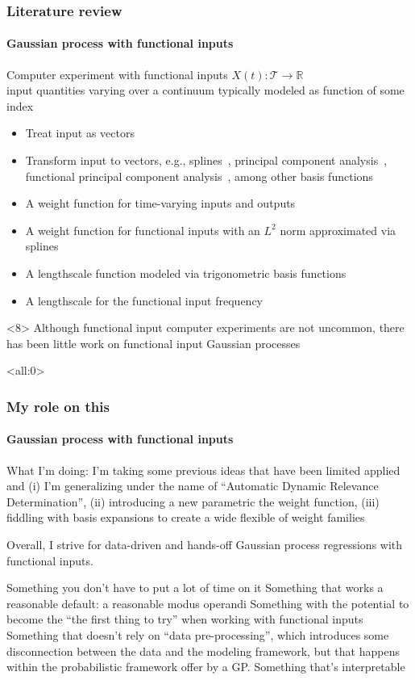 \documentclass[handout]{snedecorbeamer}
\begin{document}
\begin{frame}
  \frametitle{Literature review}
  \framesubtitle{Gaussian process with functional inputs}

  Computer experiment with functional inputs $X(t):
  \mathcal{T}\to\mathbb{R}$ \\
  input quantities varying over a continuum typically modeled as function of
  some index

  \begin{itemize}[<+(1)->]
  \item Treat input as vectors~\citep{iooss2009}
  \item Transform input to vectors, e.g.,
    splines~\citep{betancourt2020,betancourt2020a}, principal component
    analysis~\citep{nanty2016}, functional principal component
    analysis~\citep{wang2017,wang2019}, among other basis
    functions~\citep{tan2019,li2021,striegel2022}
  \item A weight function for time-varying inputs and outputs~\citep{morris2012}
  \item A weight function for functional inputs with an $L^2$ norm approximated
    via splines \citep{muehlenstaedt2017}
  \item A lengthscale function modeled via trigonometric basis functions
    \citep{kuttubekova2019}
  \item A lengthscale for the functional input frequency \citep{chen2021}
  \end{itemize}

  \vfill{}
  \begin{exampleblock}{}<8>
    Although functional input computer experiments are not uncommon,
    there has been little work on functional input Gaussian processes
  \end{exampleblock}
\end{frame}

\begin{frame}<all:0>
  \frametitle{My role on this}
  \framesubtitle{Gaussian process with functional inputs}

  What I'm doing: I'm taking some previous ideas that have been limited applied
  and (i) I'm generalizing under the name of ``Automatic Dynamic Relevance
  Determination'', (ii) introducing a new parametric the weight function,
  (iii) fiddling with basis expansions to create a wide flexible of weight
  families

  Overall, I strive for data-driven and hands-off Gaussian process regressions
  with functional inputs.

  Something you don't have to put a lot of time on it
  Something that works a reasonable default: a reasonable modus operandi
  Something with the potential to become the ``the first thing to try'' when
  working with functional inputs
  Something that doesn't rely on ``data pre-processing'', which introduces some
disconnection between the data and the modeling framework, but that happens
within the probabilistic framework offer by a GP.
  Something that's interpretable
\end{frame}
\end{document}
